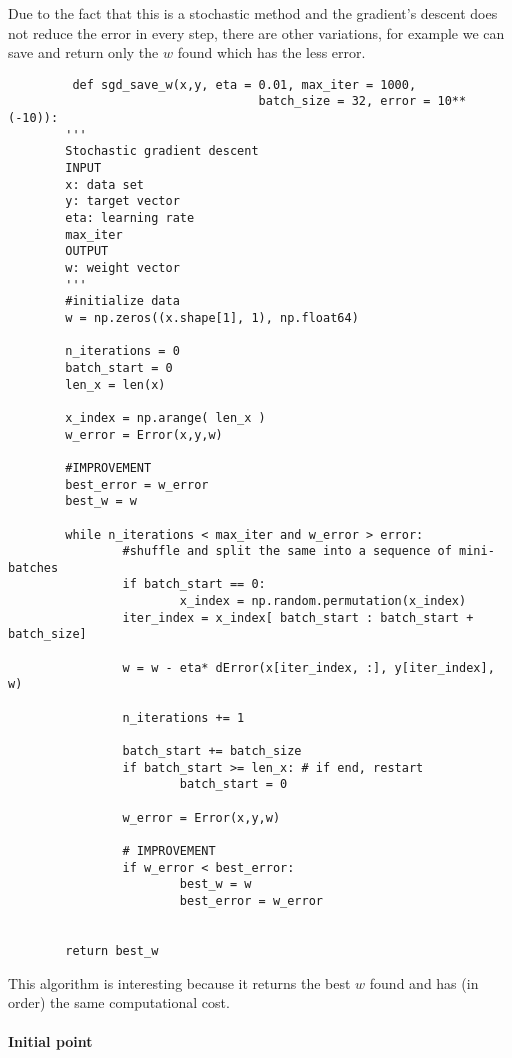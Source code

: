       Due to the fact that this is a stochastic method and the gradient's descent does not reduce the error in every step,  there are other variations, for example we can save and return only the $w$ found which has the less error.


       \begin{verbatim}
         def sgd_save_w(x,y, eta = 0.01, max_iter = 1000,
                                   batch_size = 32, error = 10**(-10)):
        '''
        Stochastic gradient descent
        INPUT 
        x: data set
        y: target vector
        eta: learning rate
        max_iter 
        OUTPUT 
        w: weight vector
        '''
        #initialize data
        w = np.zeros((x.shape[1], 1), np.float64)
    
        n_iterations = 0
        batch_start = 0
        len_x = len(x)
    
        x_index = np.arange( len_x )
        w_error = Error(x,y,w)

        #IMPROVEMENT
        best_error = w_error
        best_w = w 
 
        while n_iterations < max_iter and w_error > error:
                #shuffle and split the same into a sequence of mini-batches
                if batch_start == 0:
                        x_index = np.random.permutation(x_index)
                iter_index = x_index[ batch_start : batch_start + batch_size]

                w = w - eta* dError(x[iter_index, :], y[iter_index], w)
                
                n_iterations += 1

                batch_start += batch_size
                if batch_start >= len_x: # if end, restart
                        batch_start = 0
                
                w_error = Error(x,y,w)

                # IMPROVEMENT  
                if w_error < best_error:
                        best_w = w
                        best_error = w_error


        return best_w

      \end{verbatim}

    This algorithm is interesting because it returns the best $w$ found and has (in order) the same computational cost. 


    \paragraph{Initial point}

